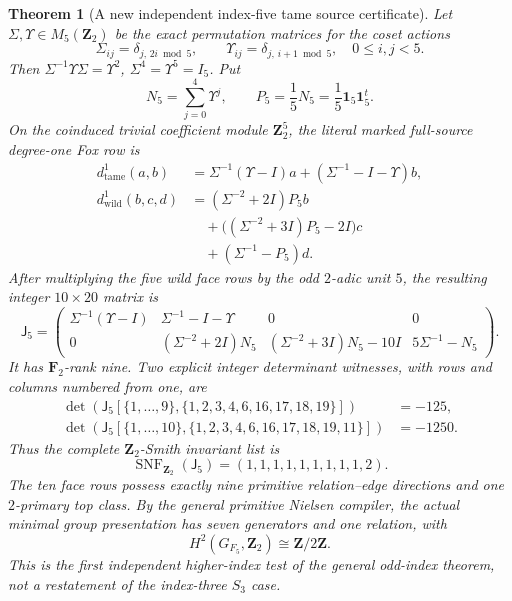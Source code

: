 \documentclass[11pt]{article}
\newtheorem{theorem}{Theorem}[section]
\theoremstyle{definition}
\begin{document}
\begin{theorem}[A new independent index-five tame source certificate]
Let $\Sigma,\Upsilon\in
M_5(\mathbf Z_2)$
be the exact
permutation matrices
for the coset
actions
\[
\Sigma_{ij}
=\delta_{j,\,2i\bmod5},
\qquad
\Upsilon_{ij}
=\delta_{j,\,i+1\bmod5},
\quad
0\le i,j<5.
\]
Then
$\Sigma^{-1}\Upsilon\Sigma=\Upsilon^2$,
$\Sigma^4=\Upsilon^5=I_5$.
Put
\begin{equation}\label{eq:dyadic-f135-index-five-norm}
N_5=\sum_{j=0}^4\Upsilon^j,
\qquad
P_5=\frac15N_5
=\frac15\mathbf1_5\mathbf1_5^t .
\end{equation}
On the coinduced
trivial coefficient
module $\mathbf Z_2^5$,
the \emph{literal}
marked full-source
degree-one Fox row is
\begin{equation}\label{eq:dyadic-f135-index-five-fox-blocks}
\boxed{
\begin{aligned}
d^1_{\mathrm{tame}}(a,b)
&=\Sigma^{-1}(\Upsilon-I)a+
   (\Sigma^{-1}-I-\Upsilon)b,\\
d^1_{\mathrm{wild}}(b,c,d)
&=(\Sigma^{-2}+2I)P_5b\\
&\quad+
\bigl((\Sigma^{-2}+3I)P_5-2I\bigr)c\\
&\quad+
(\Sigma^{-1}-P_5)d .
\end{aligned}}
\end{equation}
After multiplying
the five wild
face rows by
the odd $2$-adic
unit $5$,
the resulting
\emph{integer}
$10\times20$
matrix is
\begin{equation}\label{eq:dyadic-f135-index-five-scaled-jacobian}
\boxed{
\mathsf J_5=
\begin{pmatrix}
\Sigma^{-1}(\Upsilon-I)&
\Sigma^{-1}-I-\Upsilon&
0&0\\
0&(\Sigma^{-2}+2I)N_5&
(\Sigma^{-2}+3I)N_5-10I&
5\Sigma^{-1}-N_5
\end{pmatrix}.
}
\end{equation}
It has
$\mathbf F_2$-rank nine.
Two explicit
integer determinant
witnesses, with
rows and columns
numbered from one,
are
\begin{equation}\label{eq:dyadic-f135-index-five-minors}
\boxed{
\begin{aligned}
\det(\mathsf J_5[
\{1,\dots,9\},
\{1,2,3,4,6,16,17,18,19\}])
&=-125,\\
\det(\mathsf J_5[
\{1,\dots,10\},
\{1,2,3,4,6,16,17,18,19,11\}])
&=-1250 .
\end{aligned}}
\end{equation}
Thus the complete
$\mathbf Z_2$-Smith
invariant list is
\begin{equation}\label{eq:dyadic-f135-index-five-smith}
\boxed{\qquad
\operatorname{SNF}_{\mathbf Z_2}
(\mathsf J_5)
=(1,1,1,1,1,1,1,1,1,2).
\qquad}
\end{equation}
The ten face
rows possess
exactly nine
primitive
relation--edge
directions and one
$2$-primary top
class.  By the
general primitive
Nielsen compiler,
the actual
minimal group
presentation has
seven generators
and one relation,
with
\[
H^2(G_{F_5},\mathbf Z_2)
\cong\mathbf Z/2\mathbf Z.
\]
This is the first
independent higher-index
test of the general
odd-index theorem,
not a restatement
of the index-three
$S_3$ case.
\end{theorem}
\end{document}
